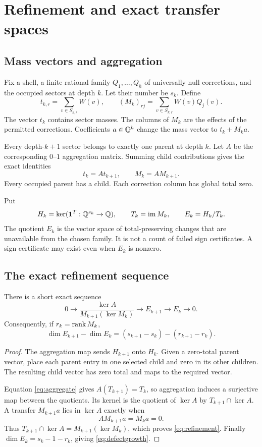 \chapter{Refinement and exact transfer spaces}\label{ch:transport}
\section{Mass vectors and aggregation}
Fix a shell, a finite rational family $Q_1,\ldots,Q_h$ of universally null corrections, and the occupied sectors at depth $k$. Let their number be $s_k$. Define
\[
t_{k,r}=\sum_{v\in S_{k,r}}W(v),\qquad
(M_k)_{rj}=\sum_{v\in S_{k,r}}W(v)Q_j(v).
\]
The vector $t_k$ contains sector masses. The columns of $M_k$ are the effects of the permitted corrections. Coefficients $a\in\mathbb Q^h$ change the mass vector to $t_k+M_ka$.

Every depth-$k+1$ sector belongs to exactly one parent at depth $k$. Let $A$ be the corresponding $0$--$1$ aggregation matrix. Summing child contributions gives the exact identities
\begin{equation}\label{eq:aggregate}
t_k=At_{k+1},\qquad M_k=AM_{k+1}.
\end{equation}
Every occupied parent has a child. Each correction column has global total zero.

Put
\[
H_k=\ker(\mathbf1^T:\mathbb Q^{s_k}\to\mathbb Q),\qquad
T_k=\operatorname{im} M_k,\qquad E_k=H_k/T_k.
\]
The quotient $E_k$ is the vector space of total-preserving changes that are unavailable from the chosen family. It is not a count of failed sign certificates. A sign certificate may exist even when $E_k$ is nonzero.

\section{The exact refinement sequence}
\begin{theorem}\label{thm:refinement}
There is a short exact sequence
\begin{equation}\label{eq:refinement}
0\longrightarrow
\frac{\ker A}{M_{k+1}(\ker M_k)}
\longrightarrow E_{k+1}\longrightarrow E_k\longrightarrow0.
\end{equation}
Consequently, if $r_k=\operatorname{rank} M_k$,
\begin{equation}\label{eq:defectgrowth}
\dim E_{k+1}-\dim E_k
=(s_{k+1}-s_k)-(r_{k+1}-r_k).
\end{equation}
\end{theorem}
\begin{proof}
The aggregation map sends $H_{k+1}$ onto $H_k$. Given a zero-total parent vector, place each parent entry in one selected child and zero in its other children. The resulting child vector has zero total and maps to the required vector.

Equation \eqref{eq:aggregate} gives $A(T_{k+1})=T_k$, so aggregation induces a surjective map between the quotients. Its kernel is the quotient of $\ker A$ by $T_{k+1}\cap\ker A$. A transfer $M_{k+1}a$ lies in $\ker A$ exactly when
\[
AM_{k+1}a=M_ka=0.
\]
Thus $T_{k+1}\cap\ker A=M_{k+1}(\ker M_k)$, which proves \eqref{eq:refinement}. Finally $\dim E_k=s_k-1-r_k$, giving \eqref{eq:defectgrowth}.
\end{proof}

